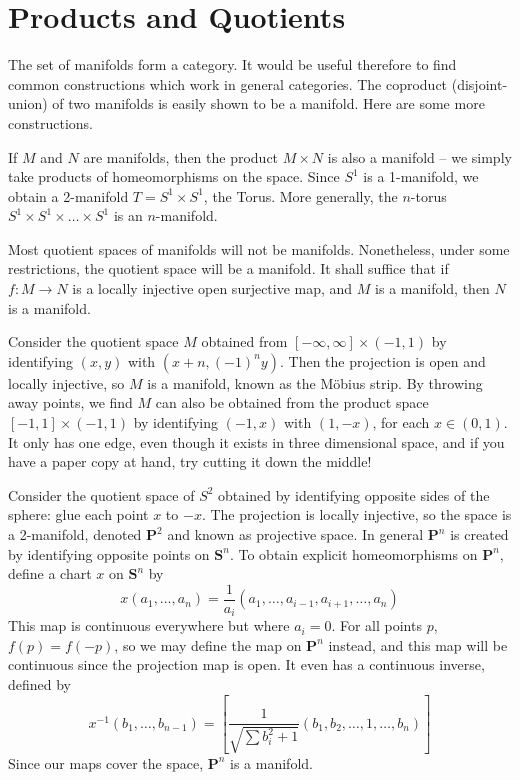 \section{Products and Quotients}

The set of manifolds form a category. It would be useful therefore to find common constructions which work in general categories. The coproduct (disjoint-union) of two manifolds is easily shown to be a manifold. Here are some more constructions.

\begin{example}
    If $M$ and $N$ are manifolds, then the product $M \times N$ is also a manifold -- we simply take products of homeomorphisms on the space. Since $S^1$ is a 1-manifold, we obtain a 2-manifold $T = S^1 \times S^1$, the Torus. More generally, the $n$-torus $S^1 \times S^1 \times \dots \times S^1$ is an $n$-manifold.
\end{example}

Most quotient spaces of manifolds will not be manifolds. Nonetheless, under some restrictions, the quotient space will be a manifold. It shall suffice that if $f:M \to N$ is a locally injective open surjective map, and $M$ is a manifold, then $N$ is a manifold.

\begin{example}
    Consider the quotient space $M$ obtained from $[-\infty, \infty] \times (-1,1)$ by identifying $(x,y)$ with $(x + n, (-1)^n y)$. Then the projection is open and locally injective, so $M$ is a manifold, known as the M\"{o}bius strip. By throwing away points, we find $M$ can also be obtained from the product space $[-1,1] \times (-1,1)$ by identifying $(-1,x)$ with $(1,-x)$, for each $x \in (0,1)$. It only has one edge, even though it exists in three dimensional space, and if you have a paper copy at hand, try cutting it down the middle!
\end{example}

\begin{example}
    Consider the quotient space of $S^2$ obtained by identifying opposite sides of the sphere: glue each point $x$ to $-x$. The projection is locally injective, so the space is a 2-manifold, denoted $\mathbf{P}^2$ and known as projective space. In general $\mathbf{P}^n$ is created by identifying opposite points on $\mathbf{S}^n$. To obtain explicit homeomorphisms on $\mathbf{P}^n$, define a chart $x$ on $\mathbf{S}^n$ by
    \[ x(a_1, \dots, a_n) = \frac{1}{a_i}(a_1, \dots, a_{i-1}, a_{i + 1}, \dots, a_n) \]
    This map is continuous everywhere but where $a_i = 0$. For all points $p$, $f(p) = f(-p)$, so we may define the map on $\mathbf{P}^n$ instead, and this map will be continuous since the projection map is open. It even has a continuous inverse, defined by
    \[ x^{-1}(b_1, \dots, b_{n-1}) = \left[ \frac{1}{\sqrt{\sum b_i^2 + 1}} \left(b_1, b_2, \dots, 1, \dots, b_n \right) \right] \]
    Since our maps cover the space, $\mathbf{P}^n$ is a manifold.
\end{example}

